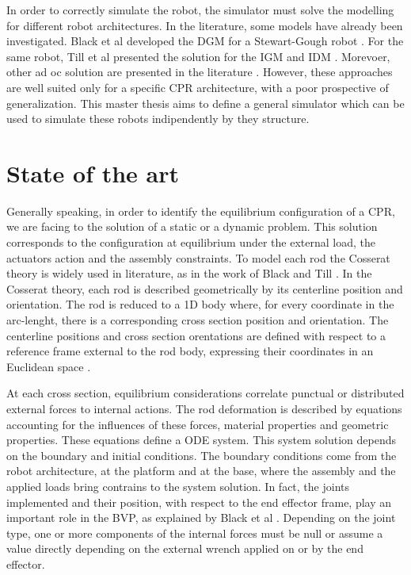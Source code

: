 \documentclass{thesisreport}
\begin{document}
 In order to correctly simulate the robot, the simulator must solve the modelling for different robot architectures. In the literature, some models have already been investigated. Black et al developed the DGM for a Stewart-Gough robot \cite{black_parallel_2018}. For the same robot, Till et al presented the solution for the IGM \cite{till_real-time_2019} and IDM \cite{till_efficient_2015}. Morevoer, other ad oc solution are presented in the literature \cite{till_efficient_2015}\cite{black_parallel_2018}\cite{till_real-time_2019}. However, these approaches are well suited only for a specific CPR architecture, with a poor prospective of generalization. This master thesis aims to define a general simulator which can be used to simulate these robots indipendently by they structure. 
 
 \chapter{State of the art}
 Generally speaking, in order to identify the equilibrium configuration of a CPR, we are facing to the solution of a static or a dynamic problem. This solution corresponds to the configuration at equilibrium under the external load, the actuators action and the assembly constraints. To model each rod the Cosserat theory is widely used in literature, as in the work of Black \cite{black_modeling_2017}\cite{black_parallel_2018} and Till \cite{till_efficient_2015}\cite{till_real-time_2019}. In the Cosserat theory, each rod is described geometrically by its centerline position and orientation. The rod is reduced to a 1D body where, for every coordinate in the arc-lenght, there is a corresponding cross section position and orientation. The centerline positions and cross section orentations are defined with respect to a reference frame external to the rod body, expressing their coordinates in an Euclidean space \cite{selig_geometric_2005}.
  
 At each cross section, equilibrium considerations correlate punctual or distributed external forces to internal actions. The rod deformation is described by equations accounting for the influences of these forces, material properties and geometric properties. These equations define a ODE system. This system solution depends on the boundary and initial conditions. The boundary conditions come from the robot architecture, at the platform and at the base, where the assembly and the applied loads bring contrains to the system solution. In fact, the joints implemented and their position, with respect to the end effector frame, play an important role in the BVP, as explained by Black et al \cite{black_parallel_2018}. Depending on the joint type, one or more components of the internal forces must be null or assume a value directly depending on the external wrench applied on or by the end effector.  
 
\end{document}

